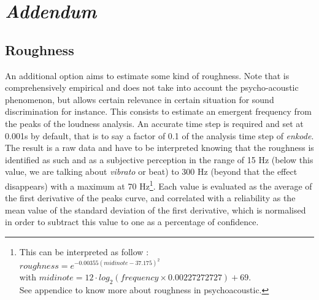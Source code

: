 \section{\textit{Addendum}}
\subsection*{Roughness}

An additional option aims to estimate some kind of roughness. Note that is comprehensively empirical and does not take into account the psycho-acoustic phenomenon, but allows certain relevance in certain situation for sound discrimination for instance. This consists to estimate an emergent frequency from the peaks of the loudness analysis. An accurate time step is required and set at 0.001s by default, that is to say a factor of 0.1 of the analysis time step of \textsl{enkode}. The result is a raw data and have to be interpreted knowing that the roughness is identified as such and as a subjective perception in the range of 15 Hz (below this value, we are talking about \textit{vibrato} or beat) to 300 Hz (beyond that the effect disappears) with a maximum at 70 Hz\footnote{This can be interpreted as follow :\\\indent \quad $roughness = e^{-0.00355 (midinote-37.175)^2}$\\ \indent \quad with $midinote=12 \cdot log_2(frequency \times 0.00227272727) + 69$.\\\indent See appendice  to know more about roughness in psychoacoustic.}. Each value is evaluated as the average of the first derivative of the peaks curve, and correlated with a reliability as the mean value of the standard deviation of the first derivative, which is normalised in order to subtract this value to one as a percentage of confidence.

